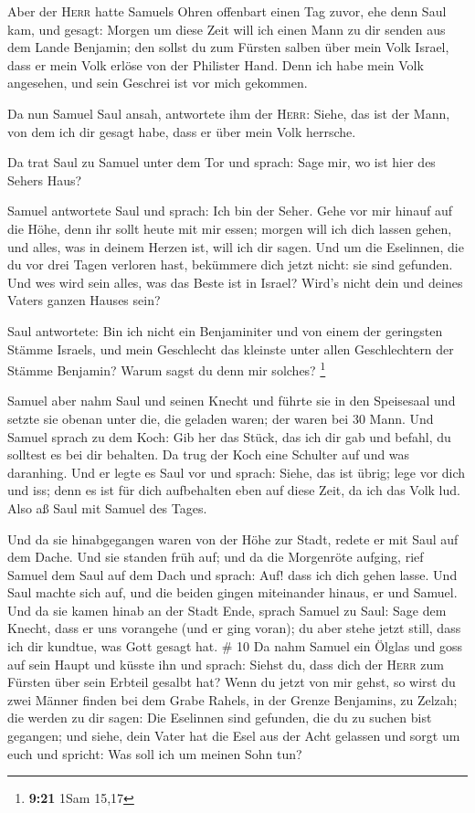  Aber der \textsc{Herr} hatte Samuels Ohren offenbart
einen Tag zuvor, ehe denn Saul kam, und gesagt:  Morgen
um diese Zeit will ich einen Mann zu dir senden aus dem Lande Benjamin;
den sollst du zum Fürsten salben über mein Volk Israel, dass er mein
Volk erlöse von der Philister Hand. Denn ich habe mein Volk angesehen,
und sein Geschrei ist vor mich gekommen.

 Da nun Samuel Saul ansah, antwortete ihm der
\textsc{Herr}: Siehe, das ist der Mann, von dem ich dir gesagt habe,
dass er über mein Volk herrsche.

 Da trat Saul zu Samuel unter dem Tor und sprach: Sage
mir, wo ist hier des Sehers Haus?

 Samuel antwortete Saul und sprach: Ich bin der Seher.
Gehe vor mir hinauf auf die Höhe, denn ihr sollt heute mit mir essen;
morgen will ich dich lassen gehen, und alles, was in deinem Herzen ist,
will ich dir sagen.  Und um die Eselinnen, die du vor
drei Tagen verloren hast, bekümmere dich jetzt nicht: sie sind gefunden.
Und wes wird sein alles, was das Beste ist in Israel? Wird's nicht dein
und deines Vaters ganzen Hauses sein?

 Saul antwortete: Bin ich nicht ein Benjaminiter und von
einem der geringsten Stämme Israels, und mein Geschlecht das kleinste
unter allen Geschlechtern der Stämme Benjamin? Warum sagst du denn mir
solches? \footnote{\textbf{9:21} 1Sam 15,17}

 Samuel aber nahm Saul und seinen Knecht und führte sie
in den Speisesaal und setzte sie obenan unter die, die geladen waren;
der waren bei 30 Mann.  Und Samuel sprach zu dem Koch:
Gib her das Stück, das ich dir gab und befahl, du solltest es bei dir
behalten.  Da trug der Koch eine Schulter auf und was
daranhing. Und er legte es Saul vor und sprach: Siehe, das ist übrig;
lege vor dich und iss; denn es ist für dich aufbehalten eben auf diese
Zeit, da ich das Volk lud. Also aß Saul mit Samuel des Tages.

 Und da sie hinabgegangen waren von der Höhe zur Stadt,
redete er mit Saul auf dem Dache.  Und sie standen früh
auf; und da die Morgenröte aufging, rief Samuel dem Saul auf dem Dach
und sprach: Auf! dass ich dich gehen lasse. Und Saul machte sich auf,
und die beiden gingen miteinander hinaus, er und Samuel. 
Und da sie kamen hinab an der Stadt Ende, sprach Samuel zu Saul: Sage
dem Knecht, dass er uns vorangehe (und er ging voran); du aber stehe
jetzt still, dass ich dir kundtue, was Gott gesagt hat. \# 10
 Da nahm Samuel ein Ölglas und goss auf sein Haupt und
küsste ihn und sprach: Siehst du, dass dich der \textsc{Herr} zum
Fürsten über sein Erbteil gesalbt hat?  Wenn du jetzt von
mir gehst, so wirst du zwei Männer finden bei dem Grabe Rahels, in der
Grenze Benjamins, zu Zelzah; die werden zu dir sagen: Die Eselinnen sind
gefunden, die du zu suchen bist gegangen; und siehe, dein Vater hat die
Esel aus der Acht gelassen und sorgt um euch und spricht: Was soll ich
um meinen Sohn tun?

